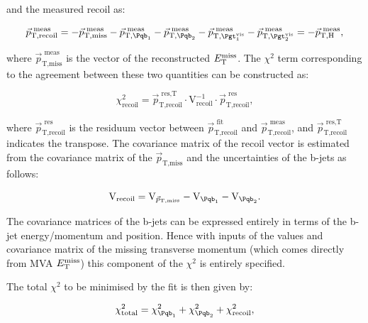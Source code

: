 and the measured recoil as:

\begin{equation}
\vec{p}_{\text{T},\text{recoil}}^{\text{~meas}} = -
\vec{p}_{\text{T},\text{miss}}^{\text{~meas}} -
\vec{p}_{\text{T},\Pqb_{1}}^{\text{~meas}} - \vec{p}_{\text{T},\Pqb_{2}}^{\text{~meas}} -
\vec{p}_{\text{T},\Pgt_{1}^{\text{vis}}}^{\text{~meas}} -
\vec{p}_{\text{T},\Pgt_{2}^{\text{vis}}}^{\text{~meas}} = -
\vec{p}_{\text{T},\text{H}}^{\text{~meas}} ,
\end{equation}

where $\vec{p}_{\text{T},\text{miss}}^{\text{~meas}}$ is the vector of the
reconstructed $E_{\mathrm{T}}^{\text{miss}}$. The $\chi^{2}$ term corresponding to the agreement between these two quantities
can be constructed as:

\begin{equation}
\chi_{\text{recoil}}^{2} = \vec{p}_{\text{T},\text{recoil}}^{\text{~res},\text{T}} \cdot
\text{V}_{\text{recoil}}^{-1} \cdot
\vec{p}_{\text{T},\text{recoil}}^{\text{~res}} ,  
\end{equation}

where $\vec{p}_{\text{T},\text{recoil}}^{\text{~res}}$ is the residuum vector between
$\vec{p}_{\text{T},\text{recoil}}^{\text{~fit}}$
and $\vec{p}_{\text{T},\text{recoil}}^{\text{~meas}}$, and
$\vec{p}_{\text{T},\text{recoil}}^{\text{~res},\text{T}}$ indicates the
transpose. The covariance matrix of the recoil vector is estimated from
the covariance matrix of the $\vec{p}_{\text{T},\text{miss}}$ and the uncertainties of the b-jets as
follows:

\begin{equation}
\text{V}_{\text{recoil}} = \text{V}_{\vec{p}_{\text{T},\text{miss}}} - \text{V}_{\Pqb_{1}} -
\text{V}_{\Pqb_{2}} .
\end{equation}

The covariance matrices of the b-jets can be expressed entirely in terms of the
b-jet energy/momentum and position. Hence with inputs of the values and
covariance matrix of the missing transverse momentum (which comes directly from
MVA $E_{\mathrm{T}}^{\text{miss}}$) this component of the $\chi^{2}$ is entirely specified. 

The total $\chi^{2}$ to be minimised by the fit is then given by:

\begin{equation}
\chi_{\text{total}}^{2} = \chi_{\Pqb_{1}}^{2} + \chi_{\Pqb_{2}}^{2} + \chi_{\text{recoil}}^{2},
\end{equation}

